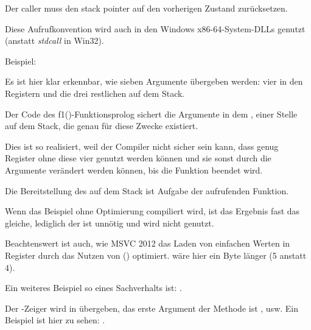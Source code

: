 Der \gls{caller} muss den \gls{stack pointer} auf den vorherigen Zustand zurücksetzen.

Diese Aufrufkonvention wird auch in den Windows x86-64-System-DLLs genutzt
(anstatt \emph{stdcall} in Win32).

Beispiel:



%



Es ist hier klar erkennbar, wie sieben Argumente übergeben werden: vier in den
Registern und die drei restlichen auf dem Stack.

Der Code des f1()-Funktionsprolog sichert die Argumente in dem ,
einer Stelle auf dem Stack, die genau für diese Zwecke existiert.

Dies ist so realisiert, weil der Compiler nicht sicher sein kann, dass genug Register
ohne diese vier genutzt werden können und sie sonst durch die Argumente verändert
werden können, bis die Funktion beendet wird.

Die Bereitstellung des  auf dem Stack ist Aufgabe der aufrufenden Funktion.

%


Wenn das Beispiel ohne Optimierung compiliert wird, ist das Ergebnis fast das gleiche,
lediglich der  ist unnötig und wird nicht genutzt.

\label{using_MOV_and_pack_of_LEA_to_load_values}

Beachtenswert ist auch, wie MSVC 2012 das Laden von einfachen Werten in Register
durch das Nutzen von \LEA () optimiert.
 wäre hier ein Byte länger (5 anstatt 4).

Ein weiteres Beispiel so eines Sachverhalts ist: .


Der \ITthis-Zeiger wird in \RCX übergeben, das erste Argument der Methode ist \RDX, usw.
Ein Beispiel ist hier zu sehen: .

